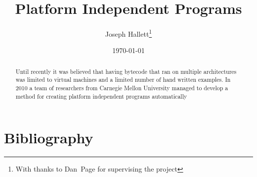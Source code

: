 \documentclass{article}
\title{Platform Independent Programs}
\author{Joseph Hallett\thanks{With thanks to Dan~Page for supervising the project}}
\date\today
\begin{document}
\maketitle

\begin{abstract}
  Until recently it was believed that having bytecode that ran on multiple
architectures was limited to virtual machines and a limited number of hand
written examples.  In 2010 a team of researchers from Carnegie Mellon University managed to develop a method for creating platform independent programs automatically\cite{Cha:2010uh}
\end{abstract}

\tableofcontents



\appendix
\section{Bibliography}


\end{document}
